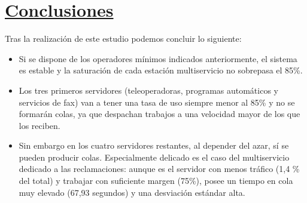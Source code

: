 \section{\textbf{\underline{Conclusiones}}}
Tras la realización de este estudio podemos concluir lo siguiente:
\begin{itemize}
\item Si se dispone de los operadores mínimos indicados anteriormente, el sistema es estable y la saturación de cada estación multiservicio no sobrepasa el 85\%.
\item Los tres primeros servidores (teleoperadoras, programas automáticos y servicios de fax) van a tener una tasa de uso siempre menor al 85\% y no se formarán colas, ya que despachan trabajos a una velocidad mayor de los que los reciben.
\item Sin embargo en los cuatro servidores restantes, al depender del azar, sí se pueden producir colas. Especialmente delicado es el caso del multiservicio dedicado a las reclamaciones: aunque es el servidor con menos tráfico (1,4 \% del total) y trabajar con suficiente margen (75\%), posee un tiempo en cola muy elevado (67,93 segundos) y una desviación estándar alta.
\end{itemize}


